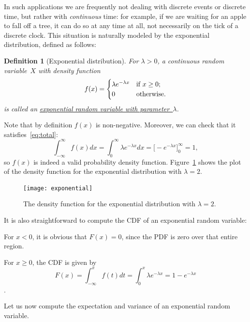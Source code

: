\documentclass[11pt]{article}
\def\ul#1{\underline{#1}}
\newcounter{thm}
\newtheorem{definition}{Definition}[thm]
\begin{document}
In such applications we are frequently not dealing with discrete events or discrete
time, but rather with {\it continuous\/} time: for example, if we are waiting for an apple to fall
off a tree, it can do so at any time at all, not necessarily on the tick of a discrete clock.
This situation is naturally modeled by the exponential distribution, defined as follows:
\begin{definition}[Exponential distribution]
For $\lambda>0$, a continuous random variable~$X$ with density function
$$
   f(x) = \begin{cases}
        \lambda e^{-\lambda x} & \hbox{\rm if $x\ge 0$};\\
        0 & \hbox{\rm otherwise}.
   \end{cases} $$
is called an \ul{exponential random variable with parameter~$\lambda$}.
\end{definition}

Note that by definition $f(x)$ is non-negative. Moreover, we can check that it satisfies~\eqref{eq:total}:
$$ \int_{-\infty}^\infty f(x)dx =
           \int_0^\infty \lambda e^{-\lambda x}dx = \bigl[-e^{-\lambda x}\bigr]_0^\infty = 1, $$
so $f(x)$ is indeed a valid probability density function. Figure~\ref{fig:exponential} shows the
plot of the density function for the exponential distribution with $\lambda = 2$.

\begin{figure}[h!]
\centering
\texttt{[image: exponential]}
\caption{The density function for the exponential distribution with $\lambda = 2$.}
\label{fig:exponential}
\end{figure}

It is also straightforward to compute the CDF of an exponential random variable:

For $x < 0$, it is obvious that $F(x) = 0$, since the PDF is zero over that entire region.

For $x \ge 0$, the CDF is given by $$F(x) = \int_{-\infty}^{x} f(t) dt = \int_{0}^{x} \lambda e^{-\lambda x} = 1 - e^{-\lambda x}$$.

Let us now compute the expectation and variance of an exponential random variable.
\end{document}
